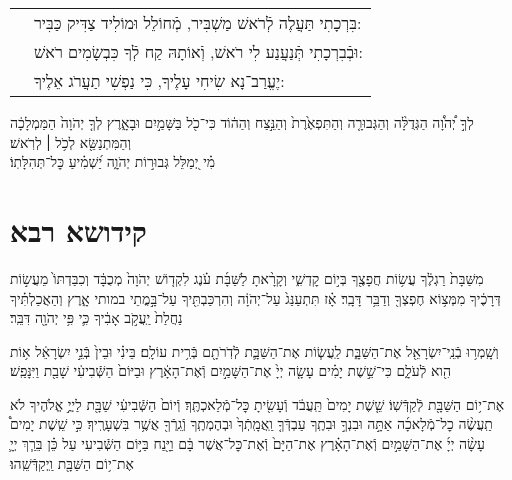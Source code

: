 \documentclass[twoside, openany, parskip=half, 11pt]{book}
\begin{document}
\begin{footnotesize}
\begin{longtable}{l p{}}
		\chazzan &
		בִּרְכָתִי תַּעֲלֶה לְֿרֹאשׁ מַשְׁבִּיר, מְֿחוֹלֵל וּמוֹלִיד צַדִּיק כַּבִּיר: \\
		
		\kahal &
		וּבְֿבִרְכָתִי תְּֿנַעֲנַע לִי רֹאשׁ, וְֿאוֹתָהּ קַח לְֿךָ כִּבְשָׂמִים רֹאשׁ: \\
		
		\chazzan &
		יֶעֱרַב־נָא שִׂיחִי עָלֶיךָ, כִּי נַפְשִׁי תַעֲרֹג אֵלֶיךָ: \\
		
	\end{longtable}
	לְךָ֣ יְ֠הֹוָ֠ה הַגְּדֻלָּ֨ה וְהַגְּבוּרָ֤ה וְהַתִּפְאֶ֙רֶת֙ וְהַנֵּ֣צַח וְהַה֔וֹד כִּי־כֹ֖ל בַּשָּׁמַ֣יִם וּבָאָ֑רֶץ לְךָ֤ יְהֹוָה֙ הַמַּמְלָכָ֔ה וְהַמִּתְנַשֵּׂ֖א לְכֹ֥ל ׀ לְרֹֽאשׁ׃\\
	מִ֗י יְ֭מַלֵּל גְּבוּר֣וֹת יְהֹוָ֑ה יַ֝שְׁמִ֗יעַ כׇּל־תְּהִלָּתֽוֹ׃ 
\end{footnotesize}




%

\mournerskaddish
\adonolam

\chapter[קידושא רבא לשבת]{ קידושא רבא }

מִשַּׁבָּת֙ רַגְלֶ֔ךָ עֲשׂ֥וֹת חֲפָצֶ֖ךָ בְּי֣וֹם קׇדְשִׁ֑י וְקָרָ֨אתָ לַשַּׁבָּ֜ת עֹ֗נֶג לִקְד֤וֹשׁ יְהֹוָה֙ מְכֻבָּ֔ד וְכִבַּדְתּוֹ֙ מֵעֲשׂ֣וֹת דְּרָכֶ֔יךָ מִמְּצ֥וֹא חֶפְצְךָ֖ וְדַבֵּ֥ר דָּבָֽר׃ אָ֗ז תִּתְעַנַּג֙ עַל־יְהֹוָ֔ה וְהִרְכַּבְתִּ֖יךָ עַל־בָּ֣מֳתֵי במותי אָ֑רֶץ וְהַאֲכַלְתִּ֗יךָ נַחֲלַת֙ יַֽעֲקֹ֣ב אָבִ֔יךָ כִּ֛י פִּ֥י יְהֹוָ֖ה דִּבֵּֽר׃ 

וְשָֽׁמְר֥וּ בְֿנֵֽי־יִשְׂרָאֵ֖ל אֶת־הַשַּׁבָּ֑ת לַֽעֲשׂ֧וֹת אֶת־הַשַּׁבָּ֛ת לְֿדֹֽרֹתָ֖ם בְּֿרִ֥ית עוֹלָֽם׃ בֵּינִ֗י וּבֵין֙ בְּֿנֵ֣י יִשְׂרָאֵ֔ל א֥וֹת הִ֖וא לְֿעֹלָ֑ם כִּי־שֵׁ֣שֶׁת יָמִ֗ים עָשָׂ֤ה יְיָ֙ אֶת־הַשָּׁמַ֣יִם וְֿאֶת־הָאָ֔רֶץ וּבַיּוֹם֙ הַשְּֿׁבִיעִ֔י שָׁבַ֖ת וַיִּנָּפַֽשׁ׃


אֶת־י֥וֹם הַשַּׁבָּ֖ת לְֿקַדְּֿשֽׁוֹ׃ שֵׁ֤שֶׁת יָמִים֙ תַּֽעֲבֹ֔ד וְֿעָשִׂ֖יתָ כׇּל־מְֿלַאכְתֶּֽךָ׃ וְֿיוֹם֙ הַשְּֿׁבִיעִ֔י שַׁבָּ֖ת לַיֽיֳ֣ אֱלֹהֶיךָ לֹא תַֽעֲשֶׂ֨ה כׇל־מְֿלָאכָ֜ה אַתָּ֣ה וּבִנְךָ֣ וּבִתֶֽךָ עַבְדְּֿךָ֤ וַֽאֲמָֽתְֿךָ֙ וּבְהֶמְתֶֽךָ וְֿגֵֽרְֿךָ֖ אֲשֶׁ֥ר בִּשְׁעָרֶֽיךָ׃ כִּ֣י שֵֽׁשֶׁת יָמִים֩ עָשָׂ֨ה יְיָ֜ אֶת־הַשָּׁמַ֣יִם וְֿאֶת־הָאָ֗רֶץ אֶת־הַיָּם֙ וְֿאֶת־כׇּל־אֲשֶׁר בָּ֔ם וַיָּ֖נַח בַּיּ֣וֹם הַשְּֿׁבִיעִי עַל כֵּ֗ן בֵּרַ֧ךְ יְיָ֛ אֶת־י֥וֹם הַשַּׁבָּ֖ת וַֽיְקַדְּֿשֵֽׁהוּ׃
\end{document}
